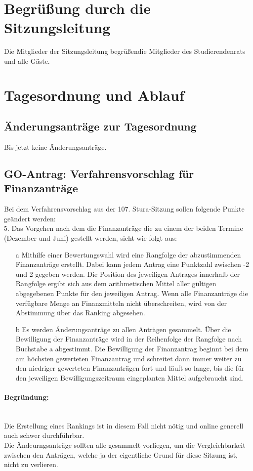\section{Begrüßung durch die Sitzungsleitung}
Die Mitglieder  der  Sitzungsleitung begrüßendie  Mitglieder  des  Studierendenrats  und  alle Gäste.

\section{Tagesordnung und Ablauf}
\tableofcontents
\subsection{Änderungsanträge zur Tagesordnung}
Bis jetzt keine Änderungsanträge.
\subsection{GO-Antrag: Verfahrensvorschlag für Finanzanträge}

Bei dem Verfahrensvorschlag aus der 107. Stura-Sitzung sollen folgende Punkte geändert werden:\\[1em]
5. Das Vorgehen nach dem die Finanzanträge die zu einem der beiden Termine (Dezember und Juni) gestellt werden, sieht wie folgt aus:\\
\begin{itemize}
    \item[a] Mithilfe  einer  Bewertungswahl  wird  eine  Rangfolge  der  abzustimmenden Finanzanträge erstellt. Dabei kann jedem Antrag eine Punktzahl zwischen -2 und 2  gegeben  werden.    Die  Position  des  jeweiligen  Antrages  innerhalb  der Rangfolge ergibt sich aus dem arithmetischen Mittel aller gültigen abgegebenen Punkte für den jeweiligen Antrag. Wenn alle Finanzanträge die verfügbare Menge an Finanzmitteln nicht überschreiten, wird von der Abstimmung über das Ranking abgesehen.
    \item[b] Es werden Änderungsanträge zu allen Anträgen gesammelt. Über die Bewilligung der Finanzanträge wird in der Reihenfolge der Rangfolge nach  Buchstabe  a  abgestimmt.  Die  Bewilligung  der  Finanzantrag  beginnt  bei dem am höchsten gewerteten Finanzantrag und schreitet dann immer weiter zu den niedriger gewerteten Finanzanträgen fort und läuft so lange, bis die für den jeweiligen Bewilligungszeitraum eingeplanten Mittel aufgebraucht sind.
\end{itemize}
\paragraph{Begründung:}\phantom{spacer}\\
Die Erstellung eines Rankings ist in diesem Fall nicht nötig und online generell auch schwer durchführbar.\\
Die Ändeurngsanträge sollten alle gesammelt vorliegen, um die Vergleichbarkeit zwischen den Anträgen, welche ja der eigentliche Grund für diese Sitzung ist, nicht zu verlieren.\\

